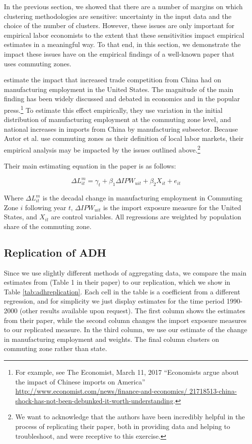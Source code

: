 In the previous section, we showed that there are a number of margins on which clustering methodologies are sensitive:  uncertainty in the input data and the choice of the number of clusters. However, these issues are only important for empirical labor economists to the extent that these
sensitivities impact empirical estimates in a meaningful way. To that end, in this section, we demonstrate the impact these issues have on the empirical findings of a well-known paper that uses commuting zones.

\citet{ADH2013} estimate the impact that increased trade competition from China had on manufacturing employment in the United States. The magnitude of the main finding has been widely discussed and debated in economics and in the popular press.\footnote{For example, see The Economist, March 11, 2017 ``Economists argue about the impact of Chinese imports on America'' \url{http://www.economist.com/news/finance-and-economics/ 21718513-china-shock-has-not-been-debunked-it-worth-understanding}.} To estimate this effect empirically, they use variation in the initial distribution of manufacturing employment at the commuting zone level, and national increases in imports from China by manufacturing subsector. Because Autor et al. use commuting zones as their definition of local labor markets, their empirical analysis may be impacted by the issues outlined above.\footnote{We want to acknowledge that the authors have been incredibly helpful in the process of replicating their paper, both in providing data and helping to troubleshoot, and were receptive to this exercise.}

Their main estimating equation in the paper is as follows:

\begin{equation}\label{eqn:adh}
\Delta L_{it}^m = \gamma_t + \beta_1 \Delta IPW_{uit} + \beta_2 X_{it} + e_{it}
\end{equation}

Where $\Delta L_{it}^m$ is the decadal change in manufacturing employment in Commuting Zone $i$ following year $t$, $\Delta IPW_{uit}$ is the import exposure measure for the United States, and $X_{it}$ are control variables. All regressions are weighted by population share of the commuting zone.

\subsection{Replication of ADH}
\FloatBarrier
Since we use slightly different methods of aggregating data, we compare the main estimates from \citet{ADH2013} (Table 1 in their paper) to our replication, which we show in Table \ref{tab:adhreplication}. Each cell in the table is a coefficient from a different regression, and for simplicity we just display estimates for the time period 1990-2000 (other results available upon request). The first column shows the estimates from their paper, while the second column changes the import exposure measures to our replicated measure. In the third column, we use our estimate of the change in manufacturing employment and weights. The final column clusters on commuting zone rather than state.

